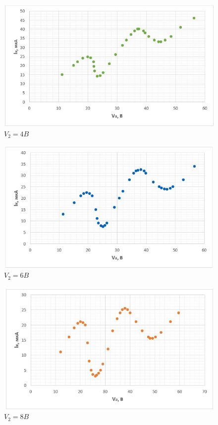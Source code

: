 \documentclass[a4paper,12pt]{article}
\begin{document}
    \begin{figure}[h!]
        \includegraphics[width=\linewidth]{4V}
        \caption{$V_2 = 4B$}
    \end{figure}
    \pagebreak
    \begin{figure}[h!]
        \includegraphics[width=\linewidth]{6V}
        \caption{$V_2 = 6B$}
    \end{figure}
    \pagebreak
    \begin{figure}[h!]
        \includegraphics[width=\linewidth]{8V}
        \caption{$V_2 = 8B$}
    \end{figure}
    
\end{document}
